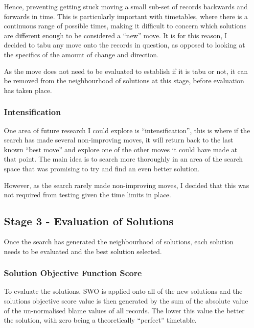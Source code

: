 \documentclass{article}
\begin{document}
\par 
Hence, preventing getting stuck moving a small sub-set of records backwards and forwards in time. This is particularly important with timetables, where there is a continuous range of possible times, making it difficult to concern which solutions are different enough to be considered a ``new'' move. It is for this reason, I decided to tabu any move onto the records in question, as opposed to looking at the specifics of the amount of change and direction.


\par 
As the move does not need to be evaluated to establish if it is tabu or not, it can be removed from the neighbourhood of solutions at this stage, before evaluation has taken place.




\subsubsection{Intensification}

One area of future research I could explore is ``intensification'', this is where if the search has made several non-improving moves, it will return back to the last known ``best move'' and explore one of the other moves it could have made at that point. The main idea is to search more thoroughly in an area of the search space that was promising to try and find an even better solution. 

\par 
However, as the search rarely made non-improving moves, I decided that this was not required from testing given the time limits in place.



\subsection{Stage 3 - Evaluation of Solutions}

Once the search has generated the neighbourhood of solutions, each solution needs to be evaluated and the best solution selected.


\subsubsection{Solution Objective Function Score}
To evaluate the solutions, SWO is applied onto all of the new solutions and the solutions objective score value is then generated by the sum of the absolute value of the un-normalised blame values of all records. The lower this value the better the solution, with zero being a theoretically ``perfect'' timetable.  
\end{document}
